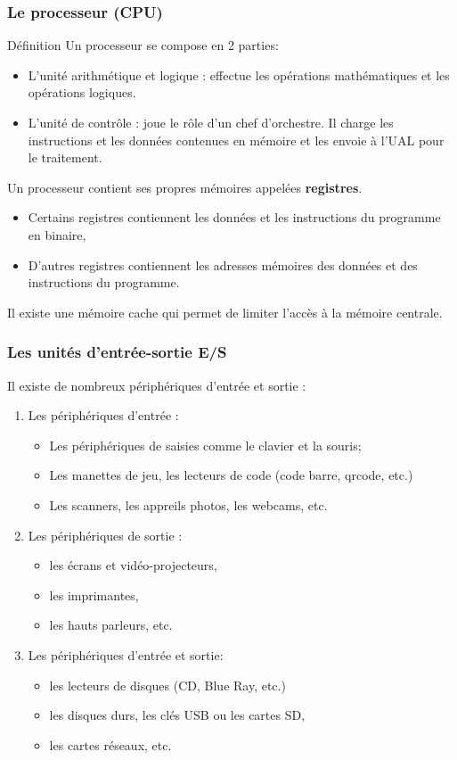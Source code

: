 \documentclass{beamer}
\begin{document}
\begin{frame}
\frametitle{Le processeur (CPU)}

\begin{block}{Définition}
Un processeur se compose en 2 parties:
\begin{itemize}
\item L'unité arithmétique et logique : effectue les opérations mathématiques et les opérations logiques.
\item L’unité de contrôle : joue le rôle d'un chef d'orchestre. Il charge les instructions et les données contenues en mémoire et les envoie à l'UAL pour le traitement.
\end{itemize}

\end{block}

Un processeur contient ses propres mémoires appelées \textbf{registres}. 
\begin{itemize}
\item Certains registres contiennent les données et les instructions du programme en binaire,
\item D'autres registres contiennent les adresses mémoires des données et des instructions du programme.
\end{itemize}
Il existe une mémoire cache qui permet de limiter l'accès à la mémoire centrale.
\end{frame}

\begin{frame}
\frametitle{Les unités d'entrée-sortie E/S}

Il existe de nombreux périphériques d'entrée et sortie :

\begin{enumerate}
\item Les périphériques d'entrée :

\begin{itemize}
\item Les périphériques de saisies comme le clavier et la souris;
\item Les manettes de jeu, les lecteurs de code (code barre, qrcode, etc.)
\item Les scanners, les appreils photos, les webcams, etc.
\end{itemize}

\item Les périphériques de sortie :
\begin{itemize}
\item les écrans et vidéo-projecteurs,
\item les imprimantes,
\item les hauts parleurs, etc.
\end{itemize}

\item Les périphériques d'entrée et sortie:
\begin{itemize}
\item les lecteurs de disques (CD, Blue Ray, etc.)
\item les disques durs, les clés USB ou les cartes SD,
\item les cartes réseaux, etc.
\end{itemize}
\end{enumerate}
\end{frame}
\end{document}
